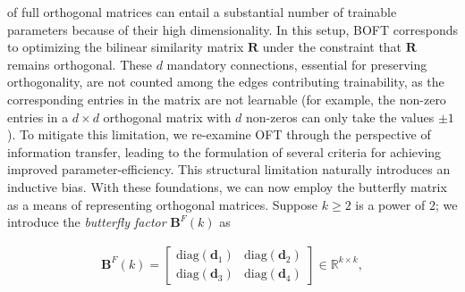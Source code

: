 of full orthogonal matrices can entail a substantial number of trainable parameters because of their high dimensionality. In this setup, BOFT corresponds to optimizing the bilinear similarity matrix $\bm{R}$ under the constraint that $\bm{R}$ remains orthogonal. These $d$ mandatory connections, essential for preserving orthogonality, are not counted among the edges contributing trainability, as the corresponding entries in the matrix are not learnable (for example, the non-zero entries in a $d \times d$ orthogonal matrix with $d$ non-zeros can only take the values $\pm 1$). To mitigate this limitation, we re-examine OFT through the perspective of information transfer, leading to the formulation of several criteria for achieving improved parameter-efficiency. This structural limitation naturally introduces an inductive bias. With these foundations, we can now employ the butterfly matrix as a means of representing orthogonal matrices. Suppose $k \geq 2$ is a power of $2$; we introduce the \emph{butterfly factor} $\bm{B}^F(k)$ as

\begin{equation}\label{eq:but_factor}
\begin{aligned}
    \bm{B}^F(k)=\begin{bmatrix}
    \text{diag}(\bm{d}_1) & \text{diag}(\bm{d}_2) \\
    \text{diag}(\bm{d}_3) & \text{diag}(\bm{d}_4)
    \end{bmatrix}\in\mathbb{R}^{k\times k},
\end{aligned}
\end{equation}

